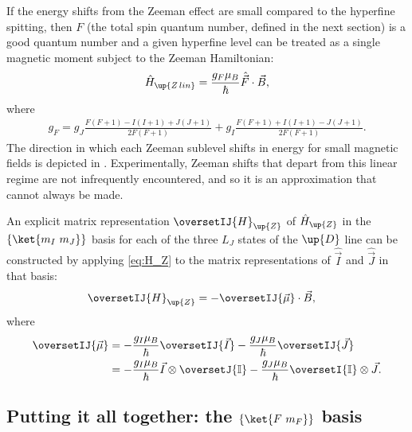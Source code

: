 If the energy shifts from the Zeeman effect are small compared to the hyperfine spitting, then $F$ (the total spin quantum number, defined in the next section) is a good quantum number and a given hyperfine level can be treated as a single magnetic moment subject to the Zeeman Hamiltonian:
\begin{align}
\hat H_\up{Z\,lin} = \frac{g_F\mu_B}{\hbar} \hat{\vec F} \cdot \vec B,
\end{align}
where \cite{steck_rubidium_2015}
\begin{align}
g_F = g_J\frac{F(F+1) - I(I+1) + J(J+1)}{2F(F+1)}
    + g_I\frac{F(F+1) + I(I+1) - J(J+1)}{2F(F+1)}.
\end{align}
The direction in which each Zeeman sublevel shifts in energy for small magnetic fields is depicted in . Experimentally, Zeeman shifts that depart from this linear regime are not infrequently encountered, and so it is an approximation that cannot always be made.

An explicit matrix representation $\oversetIJ{H}_\up{Z}$ of $\hat H_\up{Z}$ in the $\{\ket{m_I\ m_J}\}$ basis for each of the three $L_J$ states of the $\up{D}$ line can be constructed by applying \eqref{eq:H_Z} to the matrix representations of $\hat{\vec I}$ and $\hat{\vec J}$ in that basis: 
\begin{align}\label{eq:Zeeman_hamiltonian}
\oversetIJ{H}_\up{Z} &= -\oversetIJ{\vec\mu}\cdot \vec B,
\end{align}
where
\begin{align}\label{eq:magnetic_moment_operator}
\oversetIJ{\vec\mu} &=
-\frac{g_I\mu_B}{\hbar} \oversetIJ{\vec I}
- \frac{g_J\mu_B}{\hbar} \oversetIJ{\vec J}\\
&= -\frac{g_I\mu_B}{\hbar} \vec I \otimes \oversetJ{\mathbb{I}}
- \frac{g_J\mu_B}{\hbar} \oversetI{\mathbb{I}} \otimes \vec J.
\end{align}

\subsection{Putting it all together: the $\{\ket{F\ m_F}\}$ basis}\label{sec:the_F_mF_basis}


